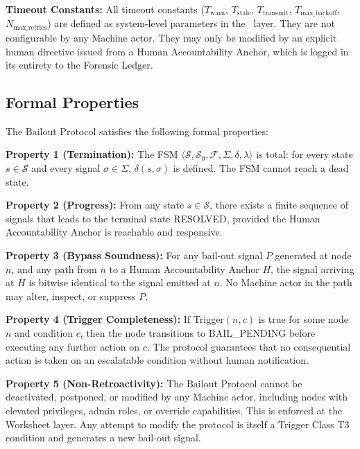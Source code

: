 \medskip
\noindent\textbf{Timeout Constants:} All timeout constants ($T_{\text{warn}}$, $T_{\text{stale}}$, $T_{\text{transmit}}$, $T_{\text{max\_backoff}}$, $N_{\text{max\_retries}}$) are defined as system-level parameters in the \bounds\ layer. They are not configurable by any Machine actor. They may only be modified by an explicit human directive issued from a Human Accountability Anchor, which is logged in its entirety to the Forensic Ledger.

\subsection{Formal Properties}

The Bailout Protocol satisfies the following formal properties:

\medskip
\noindent\textbf{Property 1 (Termination):} The FSM $\langle \mathcal{S}, \mathcal{S}_0, \mathcal{F}, \Sigma, \delta, \lambda \rangle$ is total: for every state $s \in \mathcal{S}$ and every signal $\sigma \in \Sigma$, $\delta(s, \sigma)$ is defined. The FSM cannot reach a dead state.

\medskip
\noindent\textbf{Property 2 (Progress):} From any state $s \in \mathcal{S}$, there exists a finite sequence of signals that leads to the terminal state RESOLVED, provided the Human Accountability Anchor is reachable and responsive.

\medskip
\noindent\textbf{Property 3 (Bypass Soundness):} For any bail-out signal $P$ generated at node $n$, and any path from $n$ to a Human Accountability Anchor $H$, the signal arriving at $H$ is bitwise identical to the signal emitted at $n$. No Machine actor in the path may alter, inspect, or suppress $P$.

\medskip
\noindent\textbf{Property 4 (Trigger Completeness):} If Trigger$(n, c)$ is true for some node $n$ and condition $c$, then the node transitions to BAIL\_PENDING before executing any further action on $c$. The protocol guarantees that no consequential action is taken on an escalatable condition without human notification.

\medskip
\noindent\textbf{Property 5 (Non-Retroactivity):} The Bailout Protocol cannot be deactivated, postponed, or modified by any Machine actor, including nodes with elevated privileges, admin roles, or override capabilities. This is enforced at the Worksheet layer. Any attempt to modify the protocol is itself a Trigger Class T3 condition and generates a new bail-out signal.


